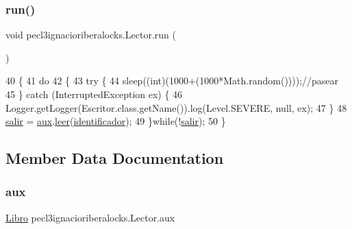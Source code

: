 \subsubsection{\texorpdfstring{run()}{run()}}
{\footnotesize\ttfamily void pecl3ignacioriberalocks.\+Lector.\+run (\begin{DoxyParamCaption}{ }\end{DoxyParamCaption})\hspace{0.3cm}{\ttfamily [inline]}}


\begin{DoxyCode}
40      \{
41          \textcolor{keywordflow}{do}
42          \{
43              \textcolor{keywordflow}{try} \{
44                 sleep((\textcolor{keywordtype}{int})(1000+(1000*Math.random())));\textcolor{comment}{//pasear}
45             \} \textcolor{keywordflow}{catch} (InterruptedException ex) \{
46                 Logger.getLogger(Escritor.class.getName()).log(Level.SEVERE, null, ex);
47             \}
48             \mbox{\hyperlink{classpecl3ignacioriberalocks_1_1_lector_a862abb7c23945623b9c4800951dc5de2}{salir}} = \mbox{\hyperlink{classpecl3ignacioriberalocks_1_1_lector_a9efbbc039743d8128a3c90cc82743a3b}{aux}}.\mbox{\hyperlink{classpecl3ignacioriberalocks_1_1_libro_ad4034cbd0be40ee9ed94da0bc98c0c66}{leer}}(\mbox{\hyperlink{classpecl3ignacioriberalocks_1_1_lector_a1bbc40775f724c5f1b591b67f5902c72}{identificador}});
49          \}\textcolor{keywordflow}{while}(!\mbox{\hyperlink{classpecl3ignacioriberalocks_1_1_lector_a862abb7c23945623b9c4800951dc5de2}{salir}});
50      \}
\end{DoxyCode}


\subsection{Member Data Documentation}
\mbox{\label{classpecl3ignacioriberalocks_1_1_lector_a9efbbc039743d8128a3c90cc82743a3b}} 
\subsubsection{\texorpdfstring{aux}{aux}}
{\footnotesize\ttfamily \mbox{\hyperlink{classpecl3ignacioriberalocks_1_1_libro}{Libro}} pecl3ignacioriberalocks.\+Lector.\+aux\hspace{0.3cm}{\ttfamily [package]}}

